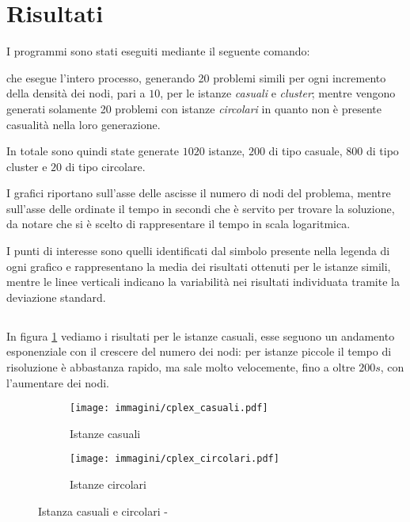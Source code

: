 \section{Risultati}
\label{sec:risultati}
I programmi sono stati eseguiti mediante il seguente comando:
\begin{quotation}
\end{quotation}
che esegue l'intero processo, generando 20 problemi simili per ogni incremento della densità dei nodi, pari a $10$, per le istanze \emph{casuali} e \emph{cluster}; mentre vengono generati solamente 20 problemi con istanze \emph{circolari} in quanto non è presente casualità nella loro generazione.

In totale sono quindi state generate $1020$ istanze, $200$ di tipo casuale, $800$ di tipo cluster e $20$ di tipo circolare.

I grafici riportano sull'asse delle ascisse il numero di nodi del problema, mentre sull'asse delle ordinate il tempo in secondi che è servito per trovare la soluzione, da notare che si è scelto di rappresentare il tempo in scala logaritmica.

I punti di interesse sono quelli identificati dal simbolo presente nella legenda di ogni grafico e rappresentano la media dei risultati ottenuti per le istanze simili, mentre le linee verticali indicano la variabilità nei risultati individuata tramite la deviazione standard.

\subsection{}

In figura \ref{fig:casuali cplex} vediamo i risultati per le istanze casuali, esse seguono un andamento esponenziale con il crescere del numero dei nodi: per istanze piccole il tempo di risoluzione è abbastanza rapido, ma sale molto velocemente, fino a oltre $200s$, con l'aumentare dei nodi.

\begin{figure}[htb]
	\centering
	\begin{subfigure}[b]{.45\textwidth}
		\texttt{[image: immagini/cplex\_casuali.pdf]}
		\caption{Istanze casuali}
		\label{fig:casuali cplex}
	\end{subfigure}
	\quad
	\begin{subfigure}[b]{.45\textwidth}
		\texttt{[image: immagini/cplex\_circolari.pdf]}
		\caption{Istanze circolari}
		\label{fig:circolari cplex}
	\end{subfigure}
	\caption{Istanza casuali e circolari - }
	\label{fig:casuali circolari cplex}
\end{figure}

